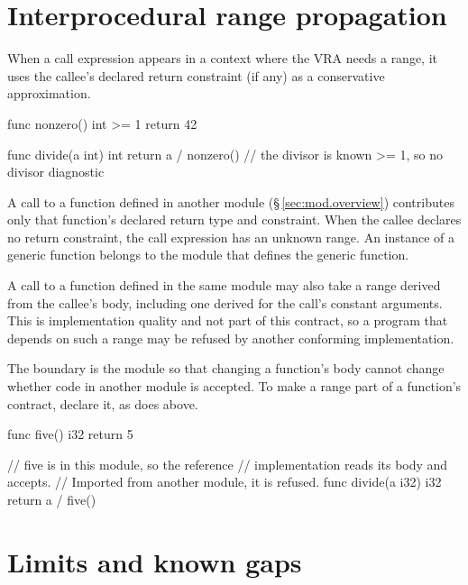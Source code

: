 \section{Interprocedural range propagation}
\label{sec:vra.interprocedural}

\pnum
When a call expression appears in a context where the VRA needs a range,
it uses the callee's declared return constraint (if any) as a conservative
approximation.

\begin{example}
\begin{laincode}
func nonzero() int >= 1 { return 42 }

func divide(a int) int {
    return a / nonzero()   // the divisor is known >= 1, so no divisor diagnostic
}
\end{laincode}
\end{example}

\pnum
A call to a function defined in another module (\S\,\ref{sec:mod.overview}) contributes only
that function's declared return type and constraint.  When the callee declares no return
constraint, the call expression has an unknown range.  An instance of a generic function belongs
to the module that defines the generic function.

\pnum
A call to a function defined in the same module may also take a range derived from the callee's
body, including one derived for the call's constant arguments.  This is implementation quality
and not part of this contract, so a program that depends on such a range may be refused by
another conforming implementation.

\begin{note}
  The boundary is the module so that changing a function's body cannot change whether code in
  another module is accepted.  To make a range part of a function's contract, declare it, as
   does above.
\end{note}

\begin{example}
\begin{laincode}
func five() i32 { return 5 }

// five is in this module, so the reference
// implementation reads its body and accepts.
// Imported from another module, it is refused.
func divide(a i32) i32 {
    return a / five()
}
\end{laincode}
\end{example}

\section{Limits and known gaps}
\label{sec:vra.limits}

